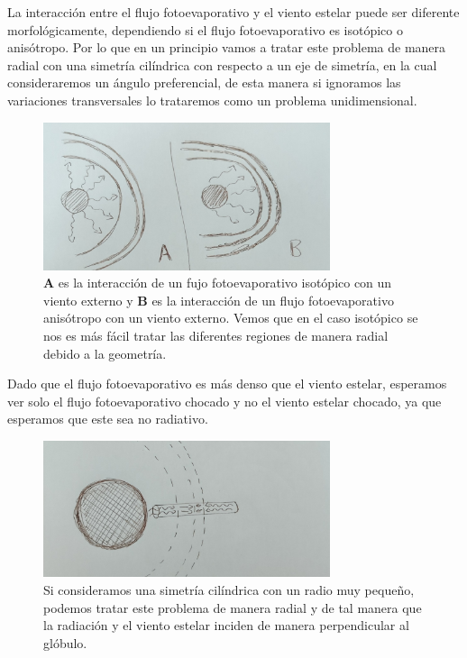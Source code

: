 \documentclass{book}
\begin{document}
La interacción entre el flujo fotoevaporativo y el viento estelar puede ser diferente morfológicamente, dependiendo si el flujo fotoevaporativo es isotópico o anisótropo. Por lo que en un principio vamos a tratar este problema de manera radial con una simetría cilíndrica con respecto a un eje de simetría, en la cual consideraremos un ángulo preferencial, de esta manera si ignoramos las variaciones transversales lo trataremos como un problema unidimensional.

\begin{figure}[h]
    \centering
    \includegraphics[width=0.75\textwidth]{Chp2_iso&ans.jpg}
    \caption{\textbf{A} es la interacción de un fujo fotoevaporativo isotópico con un viento externo y \textbf{B} es la interacción de un flujo fotoevaporativo anisótropo con un viento externo. Vemos que en el caso isotópico se nos es más fácil tratar las diferentes regiones de manera radial debido a la geometría.}
    \label{fig:isotyaniso}
\end{figure}

Dado que el flujo fotoevaporativo es más denso que el viento estelar, esperamos ver solo el flujo fotoevaporativo chocado y no el viento estelar chocado, ya que esperamos que este sea no radiativo.

\begin{figure}[h]
    \centering
    \includegraphics[width=0.75\textwidth]{Chp2_cilinders.jpg}
    \caption{Si consideramos una simetría cilíndrica con un radio muy pequeño, podemos tratar este problema de manera radial y de tal manera que la radiación y el viento estelar inciden de manera perpendicular al glóbulo.}
    \label{fig:cilinders}
\end{figure}
\end{document}
